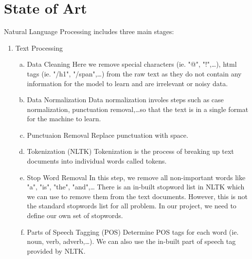 \documentclass[12pt]{article}
\begin{document}
    \section*{State of Art}

    Natural Language Processing includes three main stages:

    \begin{enumerate}

        \item Text Processing
        \begin{enumerate}[a.]
            
            \item Data Cleaning
            \newline Here we remove special characters (ie. "@", "!",\dots), html tags (ie. "/h1", "/span",\dots)
            from the raw text as they do not contain any information for the model 
            to learn and are irrelevant or noisy data.
            
            \item Data Normalization
            \newline Data normalization involes steps such as case normalization, punctuation removal,\dots so that 
            the text is in a single format for the machine to learn.
            
            \item Punctuaion Removal
            \newline Replace punctuation with space.
                
            \item Tokenization (NLTK)
            \newline Tokenization is the process of breaking up text documents into individual words called tokens.

            \item Stop Word Removal
            \newline In this step, we remove all non-important words like "a", "is", "the", "and",\dots 
            \newline There is an in-built stopword list in NLTK which we can use to remove them from the text documents. 
            However, this is not the standard stopwords list for all problem. In our project, we need to define our own set of 
            stopwords.

            \item Parts of Speech Tagging (POS)
            \newline Determine POS tags for each word (ie. noun, verb, adverb,\dots). 
            We can also use the in-built part of speech tag provided by NLTK.
           

\end{enumerate}
\end{enumerate}
\end{document}
